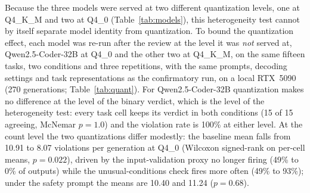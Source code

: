 \documentclass{ieeeaccess}
\begin{document}
Because the three models were served at two different quantization levels, one at
Q4\_K\_M and two at Q4\_0 (Table~\ref{tab:models}), this heterogeneity test cannot by
itself separate model identity from quantization. To bound the quantization effect, each
model was re-run after the review at the level it was \emph{not} served at,
Qwen2.5-Coder-32B at Q4\_0 and the other two at Q4\_K\_M, on the same fifteen tasks, two
conditions and three repetitions, with the same prompts, decoding settings and task
representations as the confirmatory run, on a local RTX~5090 (270 generations;
Table~\ref{tab:quant}). For Qwen2.5-Coder-32B quantization makes no difference at the
level of the binary verdict, which is the level of the heterogeneity test: every task
cell keeps its verdict in both conditions (15 of 15 agreeing, McNemar $p = 1.0$) and the
violation rate is 100\% at either level. At the count level the two quantizations differ
modestly: the baseline mean falls from 10.91 to 8.07 violations per generation at Q4\_0
(Wilcoxon signed-rank on per-cell means, $p = 0.022$), driven by the input-validation
proxy no longer firing (49\% to 0\% of outputs) while the unusual-conditions check fires
more often (49\% to 93\%); under the safety prompt the means are 10.40 and 11.24
($p = 0.68$).
\end{document}

